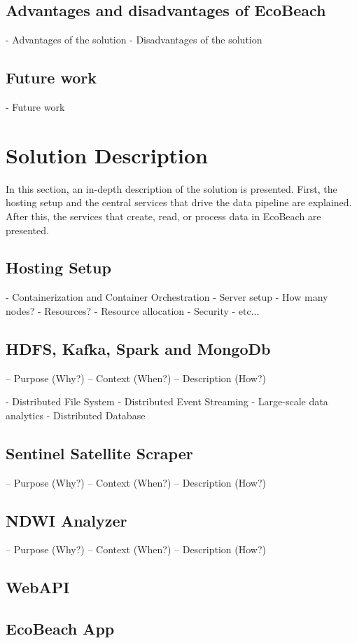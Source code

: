 \subsection{Advantages and disadvantages of EcoBeach}
- Advantages of the solution
- Disadvantages of the solution

\subsection{Future work}
- Future work

\section{Solution Description}

In this section, an in-depth description of the solution is presented.  First, the hosting setup and the central services that drive the data pipeline are explained. After this, the services that create, read, or process data in EcoBeach are presented.

\subsection{Hosting Setup}

- Containerization and Container Orchestration
- Server setup
    - How many nodes?
    - Resources?
    - Resource allocation
    - Security
    - etc...

\subsection{HDFS, Kafka, Spark and MongoDb}

– Purpose (Why?)
– Context (When?)
– Description (How?)

- Distributed File System
- Distributed Event Streaming
- Large-scale data analytics
- Distributed Database

\subsection{Sentinel Satellite Scraper}\label{subsec:sentinel-satellite-scraper}

– Purpose (Why?)
– Context (When?)
– Description (How?)

\subsection{NDWI Analyzer}\label{subsec:ndwi-analyzer}

– Purpose (Why?)
– Context (When?)
– Description (How?)

\subsection{WebAPI}

\subsection{EcoBeach App}





